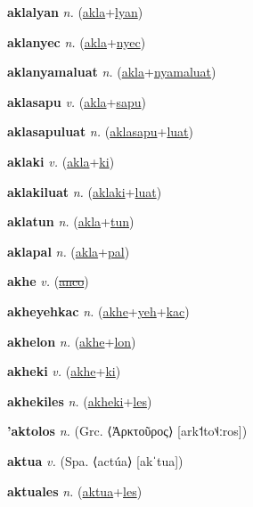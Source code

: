 \textbf{\hypertarget{aklalyan}{aklalyan}} \textit{n.} (\hyperlink{akla}{akla}+\allowbreak \hyperlink{lyan}{lyan})


\textbf{\hypertarget{aklanyec}{aklanyec}} \textit{n.} (\hyperlink{akla}{akla}+\allowbreak \hyperlink{nyec}{nyec})


\textbf{\hypertarget{aklanyamaluat}{aklanyamaluat}} \textit{n.} (\hyperlink{akla}{akla}+\allowbreak \hyperlink{nyamaluat}{nyamaluat})


\textbf{\hypertarget{aklasapu}{aklasapu}} \textit{v.} (\hyperlink{akla}{akla}+\allowbreak \hyperlink{sapu}{sapu})


\textbf{\hypertarget{aklasapuluat}{aklasapuluat}} \textit{n.} (\hyperlink{aklasapu}{aklasapu}+\allowbreak \hyperlink{luat}{luat})


\textbf{\hypertarget{aklaki}{aklaki}} \textit{v.} (\hyperlink{akla}{akla}+\allowbreak \hyperlink{ki}{ki})


\textbf{\hypertarget{aklakiluat}{aklakiluat}} \textit{n.} (\hyperlink{aklaki}{aklaki}+\allowbreak \hyperlink{luat}{luat})


\textbf{\hypertarget{aklatun}{aklatun}} \textit{n.} (\hyperlink{akla}{akla}+\allowbreak \hyperlink{tun}{tun})


\textbf{\hypertarget{aklapal}{aklapal}} \textit{n.} (\hyperlink{akla}{akla}+\allowbreak \hyperlink{pal}{pal})


\textbf{\hypertarget{akhe}{akhe}} \textit{v.} (\hyperlink{anco}{\sout{anco}})


\textbf{\hypertarget{akheyehkac}{akheyehkac}} \textit{n.} (\hyperlink{akhe}{akhe}+\allowbreak \hyperlink{yeh}{yeh}+\allowbreak \hyperlink{kac}{kac})


\textbf{\hypertarget{akhelon}{akhelon}} \textit{n.} (\hyperlink{akhe}{akhe}+\allowbreak \hyperlink{lon}{lon})


\textbf{\hypertarget{akheki}{akheki}} \textit{v.} (\hyperlink{akhe}{akhe}+\allowbreak \hyperlink{ki}{ki})


\textbf{\hypertarget{akhekiles}{akhekiles}} \textit{n.} (\hyperlink{akheki}{akheki}+\allowbreak \hyperlink{les}{les})


\textbf{\hypertarget{'aktolos}{'aktolos}} \textit{n.} (Grc. ⟨Ἀρκτοῦρος⟩ [ark˦to˦˨ːros])


\textbf{\hypertarget{aktua}{aktua}} \textit{v.} (Spa. ⟨actúa⟩ [akˈtua])


\textbf{\hypertarget{aktuales}{aktuales}} \textit{n.} (\hyperlink{aktua}{aktua}+\allowbreak \hyperlink{les}{les})



